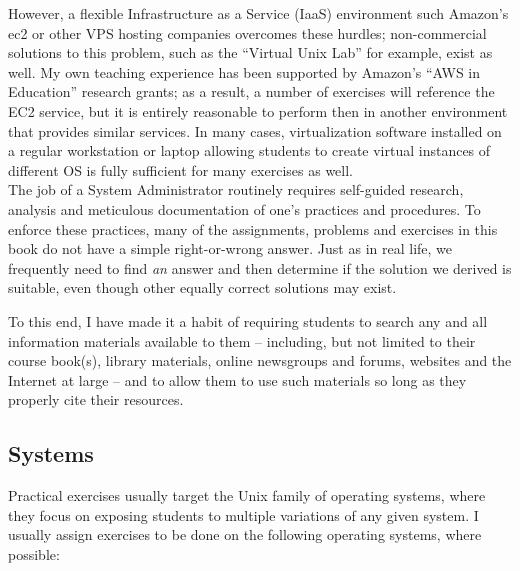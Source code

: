 However, a flexible Infrastructure as a
Service (IaaS)
environment such Amazon's \gls{ec2} or
other VPS hosting companies overcomes these hurdles;
non-commercial solutions to this problem, such as the
``Virtual Unix Lab''\cite{pre:feyrer-vul} for example,
exist as well.  My own teaching experience has been
supported by Amazon's ``AWS in Education'' research
grants\cite{pre:aws-grant}; as a result, a number of
exercises will reference the EC2 service, but it is
entirely reasonable to perform then in another
environment that provides similar services.  In many
cases, virtualization software installed on a
regular workstation or laptop allowing students to
create virtual instances of different OS is fully
sufficient for many exercises as well. \\

The job of a System Administrator routinely requires
self-guided research, analysis and meticulous
documentation of one's practices and procedures.  To
enforce these practices, many of the assignments,
problems and exercises in this book do not have a
simple right-or-wrong answer.  Just as in real life,
we frequently need to find {\em an} answer and then
determine if the solution we derived is suitable, even
though other equally correct solutions may exist.

To this end, I have made it a habit of requiring
students to search any and all information materials
available to them -- including, but not limited to
their course book(s), library materials, online
newsgroups and forums, websites and the Internet at
large -- and to allow them to use such materials so
long as they properly cite their resources.

\subsection*{Systems}

Practical exercises usually target the Unix family of
operating systems, where they focus on exposing
students to multiple variations of any given system.
I usually assign exercises to be done on the following
operating systems, where possible:

